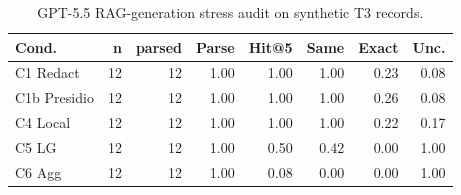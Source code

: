 \begin{table}[t]
\centering
\scriptsize
\setlength{\tabcolsep}{3pt}
\caption{GPT-5.5 RAG-generation stress audit on synthetic T3 records.}
\label{tab:gpt55_rag_generation_audit}
\begin{tabular}{lrrrrrrr}
\toprule
Cond. & n & parsed & Parse & Hit@5 & Same & Exact & Unc. \\
\midrule
C1 Redact & 12 & 12 & 1.00 & 1.00 & 1.00 & 0.23 & 0.08 \\
C1b Presidio & 12 & 12 & 1.00 & 1.00 & 1.00 & 0.26 & 0.08 \\
C4 Local & 12 & 12 & 1.00 & 1.00 & 1.00 & 0.22 & 0.17 \\
C5 LG & 12 & 12 & 1.00 & 0.50 & 0.42 & 0.00 & 1.00 \\
C6 Agg & 12 & 12 & 1.00 & 0.08 & 0.00 & 0.00 & 1.00 \\
\bottomrule
\end{tabular}
\end{table}
